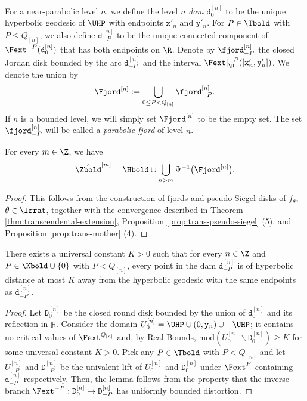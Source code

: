\documentclass{amsart}
\begin{document}
For a near-parabolic level $n$, we define the level $n$ \emph{dam} $\mathtt{d}_0^{[n]}$ to be the unique hyperbolic geodesic of $\UHP$ with endpoints $\mathtt{x}'_n$ and $\mathtt{y}'_n$.
For $P \in \Tbold$ with $P \leq Q_{[n]}$, we also define $\mathtt{d}_{-P}^{[n]}$ to be the unique connected component of $\Fext^{-P}(\mathtt{d}_0^{[n]})$ that has both endpoints on $\R$.
Denote by $\fjord_{-P}^{[n]}$ the closed Jordan disk bounded by the arc $\mathtt{d}_{-P}^{[n]}$ and the interval $\Fext|_{\R}^{-P}([\mathtt{x}'_n, \mathtt{y}'_n])$. 
We denote the union by
    \[
        \Fjord^{[n]} := \bigcup_{0 \leq P < Q_{[n]}} \fjord_{-P}^{[n]}.
    \]
If $n$ is a bounded level, we will simply set $\Fjord^{[n]}$ to be the empty set.
The set $\fjord_{-P}^{[n]}$ will be called a \emph{parabolic fjord} of level $n$.

\begin{lemma}
\label{lem:fjord-pseudo-siegel-connection}
    For every $m \in \Z$, we have
    \[
        \hat{\Zbold}^{[m]} = \Hbold \cup \bigcup_{n > m} \Psi^{-1}\big( \Fjord^{[n]} \big).
    \]
\end{lemma}

\begin{proof}
    This follows from the construction of fjords and pseudo-Siegel disks of $f_\theta$, $\theta \in \Irrat$, together with the convergence described in Theorem \ref{thm:transcendental-extension}, Proposition \ref{prop:trans-pseudo-siegel} (5), and Proposition \ref{prop:trans-mother} (4).
\end{proof}

\begin{lemma}
\label{lem:fjord-almost-invariance}
    There exists a universal constant $K>0$ such that for every $n \in \Z$ and $P \in \Kbold \cup \{0\}$ with $P < Q_{[n]}$, every point in the dam $\mathtt{d}^{[n]}_{-P}$ is of hyperbolic distance at most $K$ away from the hyperbolic geodesic with the same endpoints as $\mathtt{d}^{[n]}_{-P}$.
\end{lemma}

\begin{proof}
    Let $\mathtt{D}^{[n]}_0$ be the closed round disk bounded by the union of $\mathtt{d}^{[n]}_0$ and its reflection in $\mathbb{R}$.
    Consider the domain $U_0^{[n]} = \UHP \cup (0,\mathtt{y}_n) \cup -\UHP$; it contains no critical values of $\Fext^{Q_{[n]}}$ and, by Real Bounds, $\text{mod}(U_0^{[n]} \backslash \mathtt{D}^{[n]}_0) \geq K$ for some universal constant $K >0$.
    Pick any $P \in \Tbold$ with $P < Q_{[n]}$ and let $U^{[n]}_{-P}$ and $\mathtt{D}^{[n]}_{-P}$ be the univalent lift of $U_0^{[n]}$ and $\mathtt{D}^{[n]}_0$ under $\Fext^{P}$ containing $\mathtt{d}^{[n]}_{-P}$ respectively.
    Then, the lemma follows from the property that the inverse branch $\Fext^{-P}: \mathtt{D}^{[n]}_0 \to \mathtt{D}^{[n]}_{-P}$ has uniformly bounded distortion.
\end{proof}
\end{document}
